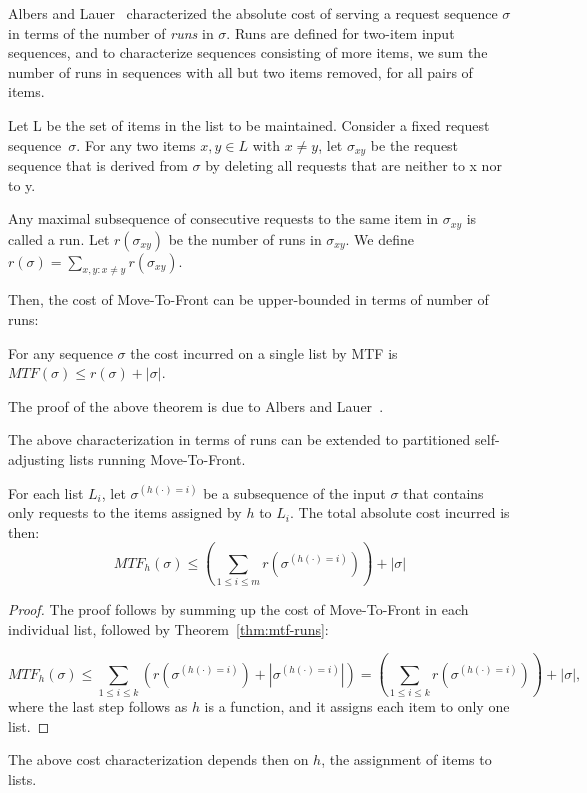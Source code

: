 Albers and Lauer~\cite{AlbersL16} characterized the absolute cost of serving a request sequence $\sigma$ in terms of the number of \emph{runs} in $\sigma$.
Runs are defined for two-item input sequences, and to characterize sequences consisting of more items, we sum the number of runs in sequences with all but two items removed, for all pairs of items.

\begin{definition}
	Let L be the set of items in the list to be maintained. Consider a fixed request sequence~$\sigma$. For any two items $x, y \in L$
	with $x \neq y$, let $\sigma_{xy}$ be the request sequence that is derived from $\sigma$ by deleting all requests that are neither to x nor
	to y.
\end{definition}

\begin{definition}
	Any maximal subsequence of consecutive requests to the same item in $\sigma_{xy}$ is called a run. Let $r(\sigma_{xy})$ be the number of runs in $\sigma_{xy}$. 
	We define $r(\sigma) = \sum_{x,y : x \neq y} r(\sigma_{xy})$.
\end{definition}
%
Then, the cost of Move-To-Front can be upper-bounded in terms of number of runs:
%
\begin{theorem}
	For any sequence $\sigma$ the cost incurred on a single list by MTF is 
	$MTF(\sigma) \le r(\sigma) + |\sigma|$.
	\label{thm:mtf-runs}
\end{theorem}
The proof of the above theorem is due to Albers and Lauer~\cite{AlbersL16}.

The above characterization in terms of runs can be extended to partitioned self-adjusting lists running Move-To-Front.
\begin{lemma}
	For each list $L_i$, let $\sigma^{(h(\cdot) = i)}$ be a subsequence of the input $\sigma$ that contains only requests to the items assigned by $h$ to $L_i$.
	The total absolute cost incurred is then:
	$$
	MTF_h(\sigma) \le (\sum_{1 \le i \le m} r(\sigma^{(h(\cdot) = i)})) + |\sigma|
	$$
	\label{lem:parallel-cost-mtf}
\end{lemma}
\begin{proof}
	The proof follows by summing up the cost of Move-To-Front in each individual list, followed by Theorem~\ref{thm:mtf-runs}:
	
	$$ MTF_h(\sigma) \le \sum_{1 \le i \le k} (r(\sigma^{(h(\cdot) = i)}) + |\sigma^{(h(\cdot) = i)}|) = (\sum_{1 \le i \le k} r(\sigma^{(h(\cdot) = i)})) + |\sigma|,$$
	where the last step follows as $h$ is a function, and it assigns each item to only one list.
\end{proof}
The above cost characterization depends then on $h$, the assignment of items to lists.

